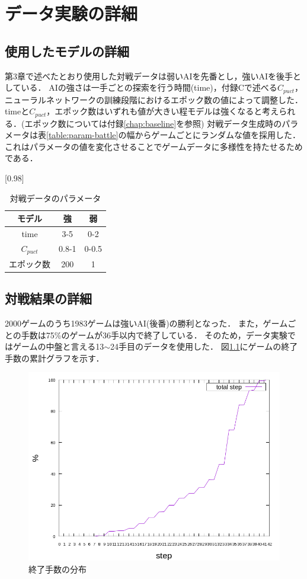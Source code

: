 \chapter{データ実験の詳細}
\label{chap:data}
\section{使用したモデルの詳細}
第3章で述べたとおり使用した対戦データは弱いAIを先番とし，強いAIを後手としている．
AIの強さは一手ごとの探索を行う時間(time)，付録Cで述べる$C_{puct}$，ニューラルネットワークの訓練段階におけるエポック数の値によって調整した．
timeと$C_{puct}$，エポック数はいずれも値が大きい程モデルは強くなると考えられる．(エポック数については付録\ref{chap:baseline}を参照)
対戦データ生成時のパラメータは表\ref{table:param-battle}の幅からゲームごとにランダムな値を採用した．
これはパラメータの値を変化させることでゲームデータに多様性を持たせるためである．
\begin{table}[H]
	\caption{対戦データのパラメータ}
	\label{table:param-battle}
	\centering
	\scalebox{0.98}[0.98]{
		\begin{tabular}{c|c|c}
			モデル&強&弱\\ \hline
			time    & 3-5 & 0-2 \\ 
			$C_{puct}$ & 0.8-1   & 0-0.5 \\
			エポック数 & 200 & 1 \\

		\end{tabular}
	}
	\label{table:battle}
\end{table}

\section{対戦結果の詳細}
2000ゲームのうち1983ゲームは強いAI(後番)の勝利となった．
また，ゲームごとの手数は75\%のゲームが36手以内で終了している．
そのため，データ実験ではゲームの中盤と言える13$\sim$24手目のデータを使用した．
図\ref{fig:stepCum}にゲームの終了手数の累計グラフを示す．
\begin{figure}[htbp]
	\centering
	\includegraphics[width=\linewidth]{./figure/stepCum.png}
	\caption{終了手数の分布}
	\label{fig:stepCum}
\end{figure}




